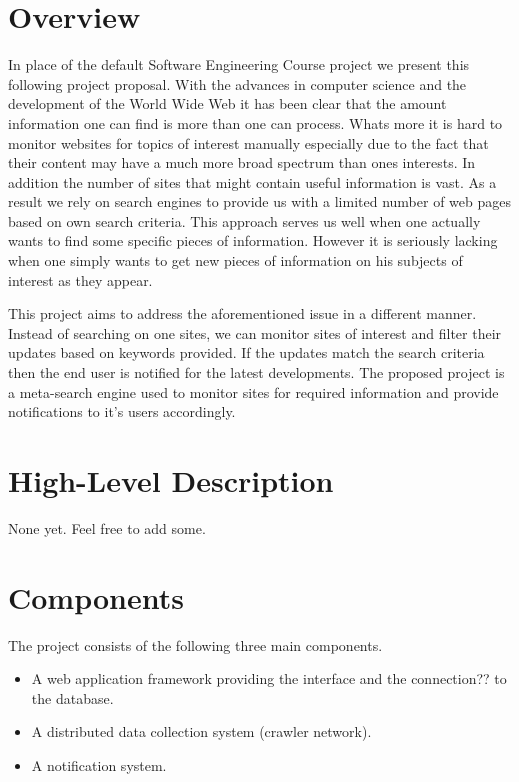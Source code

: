 \documentclass[a4paper,10pt]{article} \usepackage{anysize}
\begin{document}



\section{Overview}
    In place of the default Software Engineering Course project we present
    this following project proposal. With the advances in computer science and
    the development of the World Wide Web it has been clear that the amount
    information one can find is more than one can process. Whats more it is
    hard to monitor websites for topics of interest manually especially due to
    the fact that their content may have a much more broad spectrum than ones
    interests. In addition the number of sites that might contain useful
    information is vast. As a result we rely on search engines to provide us
    with a limited number of web pages based on own search criteria. This
    approach serves us well when one actually wants to find some specific
    pieces of information. However it is seriously lacking when one simply
    wants to get new pieces of information on his subjects of interest as they
    appear. 

    This project aims to address the aforementioned issue in a different
    manner. Instead of searching on one sites, we can monitor sites of
    interest and filter their updates based on keywords provided. If the
    updates match the search criteria then the end user is notified for the
    latest developments. The proposed project is a meta-search engine used to
    monitor sites for required information and provide notifications to it's
    users accordingly. 

\section{High-Level Description}
    None yet. Feel free to add some.
\section{Components}
    The project consists of the following three main components.
    \begin{itemize}
        \item A web application framework providing the interface and the
            connection?? to the database.
        \item A distributed data collection system (crawler network).
        \item A notification system.
    \end{itemize}
\end{document}

